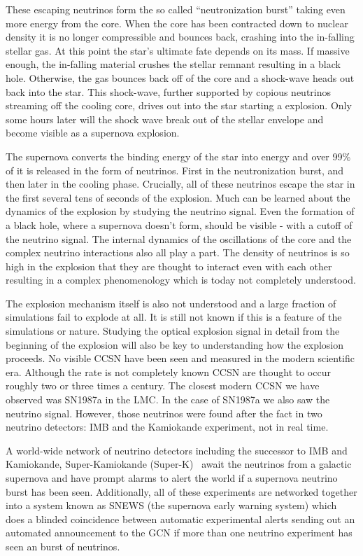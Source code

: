 \documentclass[11pt]{article}
\newcommand{\superk}  {Super\nobreakdash-K\xspace}
\begin{document}
These escaping neutrinos form the so called ``neutronization burst''
taking even more energy from the core.  When the core has been
contracted down to nuclear density it is no longer compressible and
bounces back, crashing into the in-falling stellar gas. At this point
the star's ultimate fate depends on its mass.  If massive enough, the
in-falling material crushes the stellar remnant resulting in a black
hole.  Otherwise, the gas bounces back off of the core and a
shock-wave heads out back into the star.  This shock-wave, further
supported by copious neutrinos streaming off the cooling core, drives
out into the star starting a explosion.  Only some hours later will
the shock wave break out of the stellar envelope and become visible as
a supernova explosion.

The supernova converts the binding energy of the star into energy and
over 99\% of it is released in the form of neutrinos. First in the
neutronization burst, and then later in the cooling phase.  Crucially,
all of these neutrinos escape the star in the first several tens of
seconds of the explosion. Much can be learned about the dynamics of
the explosion by studying the neutrino signal.  Even the formation of
a black hole, where a supernova doesn't form, should be visible - with
a cutoff of the neutrino signal.  The internal dynamics of the
oscillations of the core and the complex neutrino interactions also
all play a part. The density of neutrinos is so high in the explosion
that they are thought to interact even with each other resulting in a
complex phenomenology which is today not completely understood.

 The explosion mechanism itself is also not understood and a large
 fraction of simulations fail to explode at all.  It is still not
 known if this is a feature of the simulations or nature. Studying the
 optical explosion signal in detail from the beginning of the
 explosion will also be key to understanding how the explosion
 proceeds.  No visible CCSN have been seen and measured in the modern
 scientific era.  Although the rate is not completely known CCSN are
 thought to occur roughly two or three times a century.  The
 closest modern CCSN we have observed was SN1987a in the LMC.   In the
 case of SN1987a we also saw the neutrino signal. However, those
 neutrinos were found after the fact in two neutrino detectors: IMB and the
 Kamiokande experiment, not in real time.

 A world-wide network of neutrino detectors including the
 successor to IMB and Kamiokande, Super-Kamiokande
 (\superk)~\cite{superk_paper} await the neutrinos from a galactic
 supernova and have prompt alarms to alert the world if a supernova
 neutrino burst has been seen.  Additionally, all of these experiments
 are networked together into a system known as SNEWS (the supernova
 early warning system) which does a blinded coincidence between
 automatic experimental alerts sending out an automated announcement
 to the GCN if more than one neutrino experiment has seen an burst of
 neutrinos.
\end{document}
